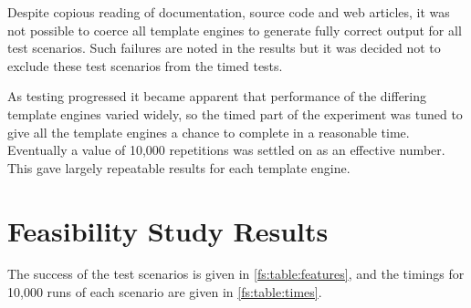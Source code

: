 Despite copious reading of documentation, source code and web articles, it was not possible to coerce all template engines to generate fully correct output for all test scenarios. Such failures are noted in the results but it was decided not to exclude these test scenarios from the timed tests.

As testing progressed it became apparent that performance of the differing template engines varied widely, so the timed part of the experiment was tuned to give all the template engines a chance to complete in a reasonable time. Eventually a value of 10,000 repetitions was settled on as an effective number. This gave largely repeatable results for each template engine.

\section{Feasibility Study Results}
\label{fs:results}

The success of the test scenarios is given in \autoref{fs:table:features}, and the timings for 10,000 runs of each scenario are given in \autoref{fs:table:times}.


